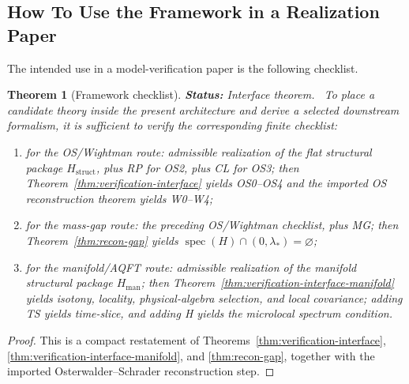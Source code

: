 \documentclass[12pt,a4paper]{article}
\theoremstyle{plain}
\newtheorem{theorem}{Theorem}[section]
\theoremstyle{definition}
\theoremstyle{remark}
\newcommand{\spec}{\operatorname{spec}}
\newcommand{\status}[1]{\textnormal{\textbf{Status:} #1.}\ }
\begin{document}
\subsection{How To Use the Framework in a Realization Paper}
\label{sec:use-framework}

The intended use in a model-verification paper is the following
checklist.

\begin{theorem}[Framework checklist]
  \label{thm:framework-checklist}
  \status{Interface theorem}
  To place a candidate theory inside the present architecture and
  derive a selected downstream formalism, it is sufficient to verify
  the corresponding finite checklist:
  \begin{enumerate}[nosep,label=(\roman*)]
  \item for the OS/Wightman route: admissible realization of the flat
    structural package \(H_{\mathrm{struct}}\), plus RP for OS2, plus
    CL for OS3; then
    Theorem~\ref{thm:verification-interface} yields OS0--OS4 and the
    imported OS reconstruction theorem yields W0--W4;
  \item for the mass-gap route: the preceding OS/Wightman checklist,
    plus MG; then Theorem~\ref{thm:recon-gap} yields
    \(\spec(H)\cap(0,\lambda_*)=\varnothing\);
  \item for the manifold/AQFT route: admissible realization of the
    manifold structural package \(H_{\mathrm{man}}\); then
    Theorem~\ref{thm:verification-interface-manifold} yields isotony,
    locality, physical-algebra selection, and local covariance; adding
    TS yields time-slice, and adding H yields the microlocal spectrum
    condition.
  \end{enumerate}
\end{theorem}
\begin{proof}
  This is a compact restatement of
  Theorems~\ref{thm:verification-interface},
  \ref{thm:verification-interface-manifold}, and
  \ref{thm:recon-gap}, together with the imported
  Osterwalder--Schrader reconstruction step.
\end{proof}
\end{document}
